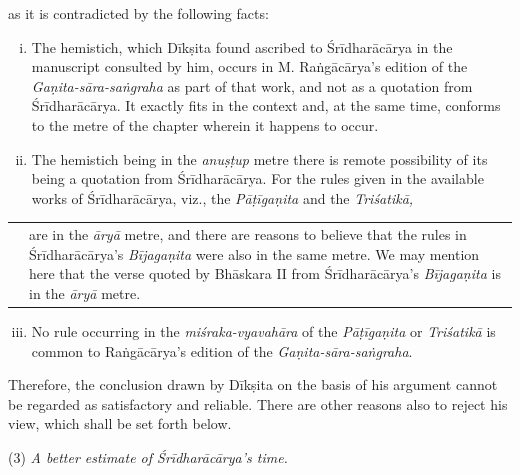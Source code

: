 \documentclass[10pt, openany]{book}
\begin{document}
{as it is contradicted by the following facts:}


\begin{enumerate}[(i)]
    \item {The hemistich, which Dīkṣita found ascribed to} 
{Śrīdharācārya in the manuscript consulted by him, }
{occurs in M. Raṅgācārya's edition of the} \textit{Gaṇita-sāra-saṅgraha}{ as part of that work, and not as a quotation}
{from Śrīdharācārya. It exactly fits in the context} 
{and, at the same time, conforms to the metre of the}
{chapter wherein it happens to occur.}

\item{The hemistich being in the \textit{anuṣṭup} metre there is}
{remote possibility of its being a quotation from Śrīdharācārya. For the rules given in the available works}
{of Śrīdharācārya, viz., the \textit{Pāṭīgaṇita} and the \textit{Triśatikā,}}
\end{enumerate}

\newpage

\englishfont
\hspace{-6mm} \begin{tabular}{p{} p{}}
& {are in the \textit{āryā} metre, and there are reasons to believe}
{that the rules in Śrīdharācārya's \textit{Bījagaṇita} were also}
{in the same metre. We may mention here that the}
{verse quoted by Bhāskara II from Śrīdharācārya's}
{\textit{Bījagaṇita} is in the \textit{āryā} metre.}
\end{tabular}

\begin{enumerate}[(i)]
  \setcounter{enumi}{2}
    \item {No rule occurring in the \textit{miśraka-vyavahāra} of the}
{\textit{Pāṭīgaṇita} or\textit{ Triśatikā} is common to Raṅgācārya's}
{edition of the \textit{Gaṇita-sāra-saṅgraha}.}
\end{enumerate}

{Therefore, the conclusion drawn by Dīkṣita on the basis of}
{his argument cannot be regarded as satisfactory and reliable.}
{There are other reasons also to reject his view, which shall be}
{set forth below.}

 \vspace{0.4cm}(3) \textit{A better estimate of Śrīdharācārya's time.}
\end{document}
